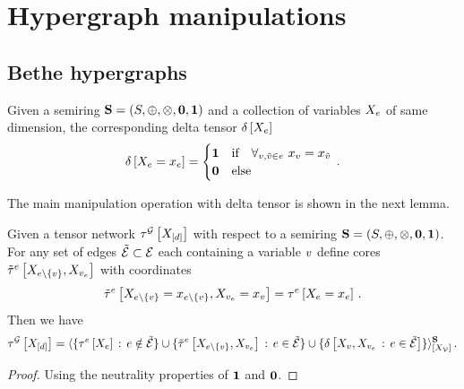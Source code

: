 \section{Hypergraph manipulations}

\subsection{Bethe hypergraphs}

\begin{definition}
    Given a semiring $\mathbf{S}=(S,\oplus,\otimes,\mathbf{0},\mathbf{1})$ and a collection of variables $X_{e}$ of same dimension, the corresponding delta tensor $\delta\left[X_{e}\right]$
    \begin{align*}
        \delta\left[X_{e}=x_{e}\right]
        = \begin{cases}
              \mathbf{1} & \text{if}\quad \forall_{v,\tilde{v}\in e} \,\, {x_{v} = x_{\tilde{v}}} \\
              \mathbf{0} & \text{else}
        \end{cases} \, .
    \end{align*}
\end{definition}

The main manipulation operation with delta tensor is shown in the next lemma.

\begin{lemma}
    Given a tensor network $\tau^{\mathcal{G}}\left[X_{[d]}\right]$ with respect to a semiring $\mathbf{S}=(S,\oplus,\otimes,\mathbf{0},\mathbf{1})$.
    For any set of edges $\tilde{\mathcal{E}}\subset\mathcal{E}$ each containing a variable $v$ define cores $\tilde{\tau}^{e}\left[X_{e\backslash\{v\}},X_{v_{e}}\right] $ with coordinates
    \begin{align*}
        \tilde{\tau}^{e}\left[X_{e\backslash\{v\}}=x_{e\backslash\{v\}},X_{v_{e}}=x_{v}\right]
        = \tau^{e}\left[X_{e}=x_{e}\right] \, .
    \end{align*}
    Then we have
    \begin{align*}
        \tau^{\mathcal{G}}\left[X_{[d]}\right] =
        \langle
            \{\tau^{e}\left[X_{e}\right]\,:\, e\notin\tilde{\mathcal{E}}\}
            \cup
            \{ \tilde{\tau}^{e}\left[X_{e\backslash\{v\}},X_{v_{e}}\right] \,:\, e\in\tilde{\mathcal{E}}\}
            \cup
            \{\delta\left[X_{v},X_{v_{e}}\,:\,e\in\tilde{\mathcal{E}}\right]\}
        \rangle^{\mathbf{S}}_{[
            X_{\mathcal{V}}
        ]} \, .
    \end{align*}
\end{lemma}
\begin{proof}
    Using the neutrality properties of $\mathbf{1}$ and $\mathbf{0}$.
\end{proof}



